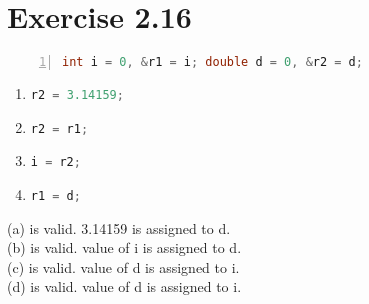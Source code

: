 \documentclass{article}
\begin{document}
    
\section*{Exercise 2.16}

\begin{lstlisting}[language=C++, numbers=left, xleftmargin=2em, basicstyle=\ttfamily]
int i = 0, &r1 = i; double d = 0, &r2 = d;    
\end{lstlisting}

\begin{enumerate}[label=(\alph*)]
\item \lstinline[language=C++]|r2 = 3.14159;|
\item \lstinline[language=C++]|r2 = r1;|
\item \lstinline[language=C++]|i = r2;|
\item \lstinline[language=C++]|r1 = d;|
\end{enumerate}

\begin{flushleft}
(a) is valid. 3.14159 is assigned to d.\\
(b) is valid. value of i is assigned to d.\\
(c) is valid. value of d is assigned to i. \\
(d) is valid. value of d is assigned to i. \\
\end{flushleft}
\end{document}
